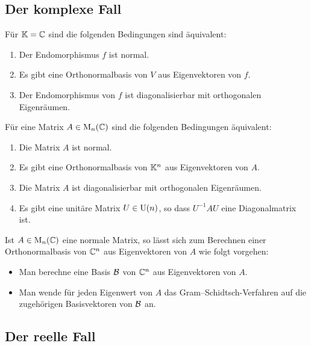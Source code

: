 \subsection{Der komplexe Fall}

\begin{theorem}
  Für $\mathbb{K} = \mathbb{C}$ sind die folgenden Bedingungen sind äquivalent:
  \begin{enumerate}
    \item
      Der Endomorphismus $f$ ist normal.
    \item
      Es gibt eine Orthonormalbasis von $V$ aus Eigenvektoren von $f$.
    \item
      Der Endomorphismus von $f$ ist diagonalisierbar mit orthogonalen Eigenräumen.
  \end{enumerate}
\end{theorem}

\begin{corollary}
  Für eine Matrix $A \in \operatorname{M}_{n}(\mathbb{C})$ sind die folgenden Bedingungen äquivalent:
  \begin{enumerate}
    \item
      Die Matrix $A$ ist normal.
    \item
      Es gibt eine Orthonormalbasis von $\mathbb{K}^n$ aus Eigenvektoren von $A$.
    \item
      Die Matrix $A$ ist diagonalisierbar mit orthogonalen Eigenräumen.
    \item
      Es gibt eine unitäre Matrix $U \in \operatorname{U}(n)$, so dass $U^{-1} A U$ eine Diagonalmatrix ist.
  \end{enumerate}
\end{corollary}


Ist $A \in \operatorname{M}_{n}(\mathbb{C})$ eine normale Matrix, so lässt sich zum Berechnen einer Orthonormalbasis von $\mathbb{C}^n$ aus Eigenvektoren von $A$ wie folgt vorgehen:
\begin{itemize}
  \item
    Man berechne eine Basis $\mathcal{B}$ von $\mathbb{C}^n$ aus Eigenvektoren von $A$.
  \item
    Man wende für jeden Eigenwert von $A$ das Gram--Schidtsch-Verfahren auf die zugehörigen Basisvektoren von $\mathcal{B}$ an.
\end{itemize}



\subsection{Der reelle Fall}


